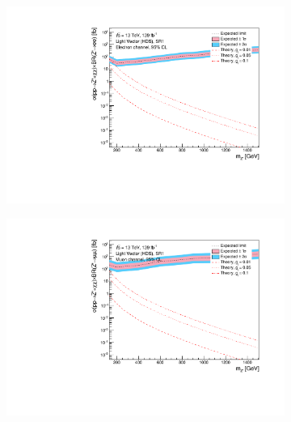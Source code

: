 \documentclass[12pt, a4paper]{book}
\begin{document}
\begin{figure}[!ht]
	\centering
	\begin{subfigure}[b]{0.49\textwidth}
      \centering
      \includegraphics[width=1\textwidth]{Limits/Model_independent/50-100/LV_HDS/mass_exclusion_ee.pdf}
   \end{subfigure}
   \hfill
   \begin{subfigure}[b]{0.49\textwidth}
      \centering
      \includegraphics[width=1\textwidth]{Limits/Model_independent/50-100/LV_HDS/mass_exclusion_uu.pdf}
   \end{subfigure}
   \hfill
   \begin{subfigure}[b]{0.49\textwidth}
      \centering

\end{subfigure}
\end{figure}
\end{document}
